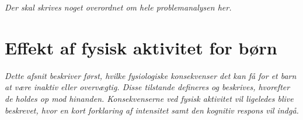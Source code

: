 {\color{red}\textit{Der skal skrives noget overordnet om hele problemanalysen her.}}

\section{Effekt af fysisk aktivitet for børn}\label{sec:fysio}
\textit{Dette afsnit beskriver først, hvilke fysiologiske konsekvenser det kan få for et barn at være inaktiv eller overvægtig. Disse tilstande defineres og beskrives, hvorefter de holdes op mod hinanden. Konsekvenserne ved fysisk aktivitet vil ligeledes blive beskrevet, hvor en kort forklaring af intensitet samt den kognitiv respons vil indgå.}

